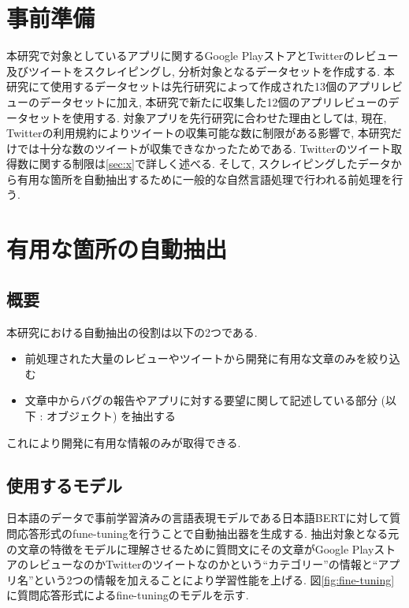 \section{事前準備}
本研究で対象としているアプリに関するGoogle PlayストアとTwitterのレビュー及びツイートをスクレイピングし, 分析対象となるデータセットを作成する. 本研究にて使用するデータセットは先行研究によって作成された13個のアプリレビューのデータセットに加え, 本研究で新たに収集した12個のアプリレビューのデータセットを使用する. 
対象アプリを先行研究に合わせた理由としては, 現在, Twitterの利用規約によりツイートの収集可能な数に制限がある影響で, 本研究だけでは十分な数のツイートが収集できなかったためである. Twitterのツイート取得数に関する制限は\ref{sec:x}で詳しく述べる. 
そして, スクレイピングしたデータから有用な箇所を自動抽出するために一般的な自然言語処理で行われる前処理を行う. 


\section{有用な箇所の自動抽出}
\subsection{概要}
本研究における自動抽出の役割は以下の2つである. 
\begin{itemize}
  \item 前処理された大量のレビューやツイートから開発に有用な文章のみを絞り込む
  \item 文章中からバグの報告やアプリに対する要望に関して記述している部分 (以下 : オブジェクト) を抽出する
\end{itemize}
これにより開発に有用な情報のみが取得できる. 

\subsection{使用するモデル}
日本語のデータで事前学習済みの言語表現モデルである日本語BERTに対して質問応答形式のfune-tuningを行うことで自動抽出器を生成する. 
抽出対象となる元の文章の特徴をモデルに理解させるために質問文にその文章がGoogle PlayストアのレビューなのかTwitterのツイートなのかという``カテゴリー''の情報と``アプリ名''という2つの情報を加えることにより学習性能を上げる. 
図\ref{fig:fine-tuning}に質問応答形式によるfine-tuningのモデルを示す. 

